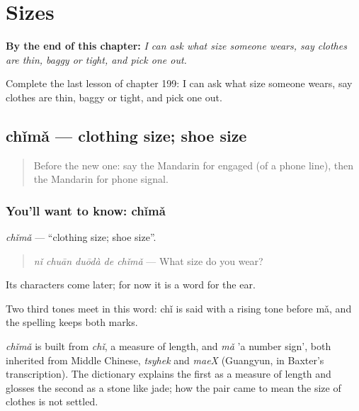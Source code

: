 
\chapter{Sizes}
\label{ch:zh-sizes}

\begin{chapteropening}
\textbf{By the end of this chapter:} \emph{I can ask what size someone wears, say clothes are thin, baggy or tight, and pick one out.}

Complete the last lesson of chapter 199: I can ask what size someone wears, say clothes are thin, baggy or tight, and pick one out.
\end{chapteropening}

\section[chǐmǎ]{chǐmǎ — clothing size; shoe size}

\label{lesson:ZH-C199-chima}



\begin{quote}
Before the new one: say the Mandarin for engaged (of a phone line), then the Mandarin for phone signal.
\end{quote}

\subsection*{You'll want to know: chǐmǎ}
\emph{chǐmǎ} — \textquotedblleft{}clothing size; shoe size\textquotedblright{}.

\begin{quote}
\emph{nǐ chuān duōdà de chǐmǎ} — What size do you wear?
\end{quote}

Its characters come later; for now it is a word for the ear.

Two third tones meet in this word: chǐ is said with a rising tone before mǎ, and the spelling keeps both marks.

\begin{cousinweb}
\emph{chǐmǎ} is built from \emph{chǐ}, a measure of length, and \emph{mǎ} 'a number sign', both inherited from Middle Chinese, \emph{tsyhek} and \emph{maeX} (Guangyun, in Baxter's transcription). The dictionary explains the first as a measure of length and glosses the second as a stone like jade; how the pair came to mean the size of clothes is not settled.
\end{cousinweb}

